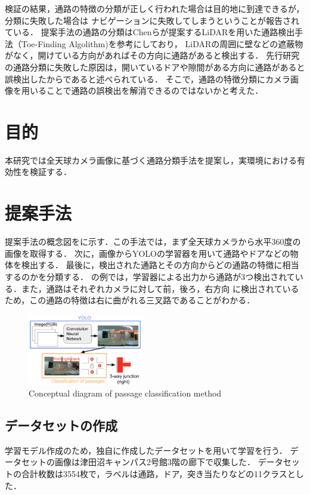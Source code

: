 \documentclass[10pt]{jarticle}
\begin{document}
    検証の結果，通路の特徴の分類が正しく行われた場合は目的地に到達できるが，分類に失敗した場合は
    ナビゲーションに失敗してしまうということが報告されている．
    提案手法の通路の分類はChenらが提案するLiDARを用いた通路検出手法（Toe-Finding Algolithm)\cite{toe_finding_algolithm}を参考にしており，
    LiDARの周囲に壁などの遮蔽物がなく，開けている方向があればその方向に通路があると検出する．
    先行研究の通路分類に失敗した原因は，開いているドアや隙間がある方向に通路があると誤検出したからであると述べられている．
    そこで，通路の特徴分類にカメラ画像を用いることで通路の誤検出を解消できるのではないかと考えた．

    \section{目\hspace{2zw}的}
    本研究では全天球カメラ画像に基づく通路分類手法を提案し，実環境における有効性を検証する．
    
    \section{提案手法}%
    提案手法の概念図をに示す．この手法では，まず全天球カメラから水平360度の画像を取得する．
    次に，画像からYOLOの学習器を用いて通路やドアなどの物体を検出する．
    最後に，検出された通路とその方向からどの通路の特徴に相当するのかを分類する．
    の例では，学習器による出力から通路が3つ検出されている．また，通路はそれぞれカメラに対して前，後ろ，右方向
    に検出されているため，この通路の特徴は右に曲がれる三叉路であることがわかる．
    
    \begin{figure}
        \includegraphics[width=0.45\textwidth]{./fig/fontbig2_proposed_method.png}
        \caption{Conceptual diagram of passage classification method}
        \label{fig:proposed_method}
    \end{figure}
    

    \subsection{データセットの作成}
     学習モデル作成のため，独自に作成したデータセットを用いて学習を行う．
     データセットの画像は津田沼キャンパス2号館3階の廊下で収集した．
     データセットの合計枚数は3554枚で，ラベルは通路，ドア，突き当たりなどの11クラスとした．
\end{document}
